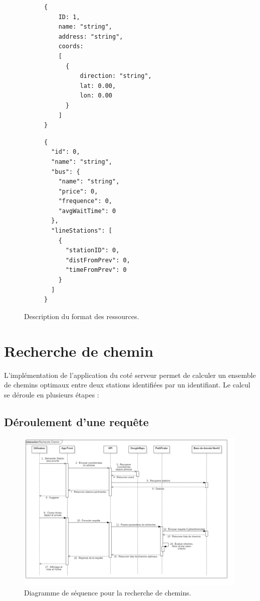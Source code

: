 \begin{figure}[h!]
	\begin{subfigure}[b]{0.45\linewidth}
		\begin{lstlisting}[caption=Format JSON de Station]
{
	ID: 1,
	name: "string",
	address: "string",
	coords: 
	[
	  {
	  	  direction: "string",
  		  lat: 0.00,
   		  lon: 0.00
	  }
	]
}
		\end{lstlisting}
	\end{subfigure}\hfill%
	\begin{subfigure}[b]{0.45\linewidth}
		\begin{lstlisting}[caption=Format JSON de Line]
{
  "id": 0,
  "name": "string",
  "bus": {
    "name": "string",
    "price": 0,
    "frequence": 0,
    "avgWaitTime": 0
  },
  "lineStations": [
    {
      "stationID": 0,
      "distFromPrev": 0,
      "timeFromPrev": 0
    }
  ]
}
		\end{lstlisting}
	\end{subfigure}\hfill%
	\caption{Description du format des ressources.}
	\label{fig:formatResources}
\end{figure}

\section{Recherche de chemin}
L'implémentation de l'application du coté serveur permet de calculer un ensemble de chemins optimaux entre deux stations identifiées par un identifiant. Le calcul se déroule en plusieurs étapes :
\subsection{Déroulement d'une requête}

\begin{figure}[h!]
	\center
	\includegraphics[width=0.99\textwidth]{img/RechercheChemin.png}
	\caption{Diagramme de séquence pour la recherche de chemins.}
	\label{fig:diagSequence}
\end{figure}

